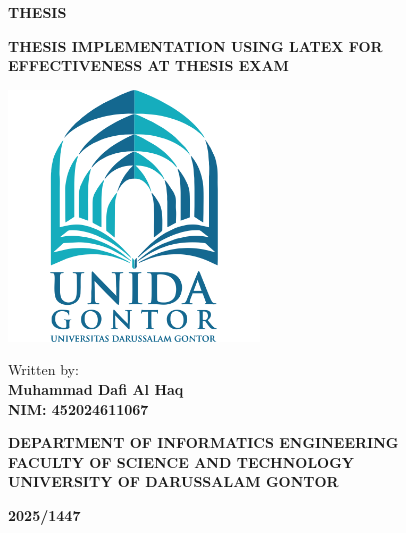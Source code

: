 \begin{titlepage}
	\centering
	\onehalfspacing
	
	{\fontsize{16}{18}\selectfont \textbf{THESIS}} %
	
	\vspace*{12pt}
	
	{\fontsize{16}{18}\selectfont \textbf{THESIS IMPLEMENTATION USING LATEX FOR EFFECTIVENESS AT THESIS EXAM}} %
	
	\vfill
	
	\includegraphics[width=0.5\textwidth]{assets/logo.png}
	
	\vfill
	
	{\large Written by:\\
	\textbf{Muhammad Dafi Al Haq\\
	NIM: 452024611067}}

	\vspace*{2cm}
	
	{\large \textbf{
	DEPARTMENT OF INFORMATICS ENGINEERING\\
	FACULTY OF SCIENCE AND TECHNOLOGY\\
	UNIVERSITY OF DARUSSALAM GONTOR}}\\

	\vspace*{0.5cm}
	
	{\large \textbf{2025/1447}}
	
\end{titlepage}


